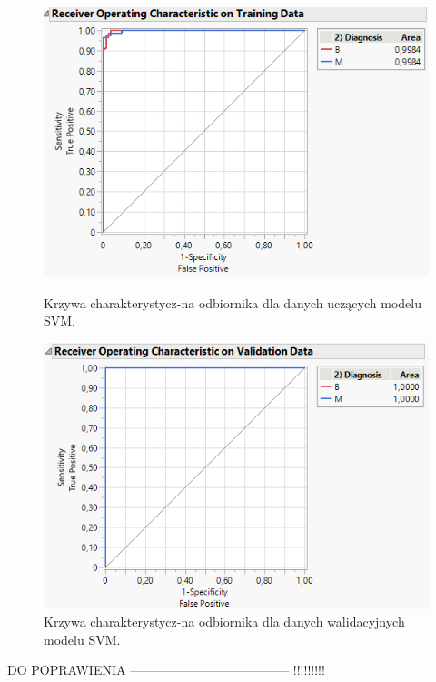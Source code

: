 \begin{figure}[!ht]
	\begin{minipage}{0.48\textwidth}
		\centering
		\includegraphics[width=0.98\linewidth]{Rysunki/Rozdzial3/roc_svm1_test}
		\caption{Krzywa charakterystycz-na odbiornika dla danych uczących modelu SVM.}
		\label{fig:rocsvm1test}		
	\end{minipage}%
	\hspace{10pt}
	\begin{minipage}{0.48\textwidth}
		\centering
		\includegraphics[width=0.98\linewidth]{Rysunki/Rozdzial3/roc_svm1_val}
		\caption{Krzywa charakterystycz-na odbiornika dla danych walidacyjnych modelu SVM.}
		\label{fig:rocsvm1val}				
	\end{minipage}	
\end{figure}

DO POPRAWIENIA -------------------------------------- !!!!!!!!!

